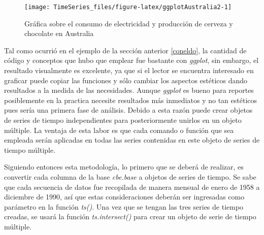 \documentclass[
  spanish,
]{book}
\newenvironment{Shaded}{\begin{snugshade}}{\end{snugshade}}
\newcommand{\AttributeTok}[1]{\textcolor[rgb]{0.77,0.63,0.00}{#1}}
\newcommand{\CommentTok}[1]{\textcolor[rgb]{0.56,0.35,0.01}{\textit{#1}}}
\newcommand{\DecValTok}[1]{\textcolor[rgb]{0.00,0.00,0.81}{#1}}
\newcommand{\FunctionTok}[1]{\textcolor[rgb]{0.00,0.00,0.00}{#1}}
\newcommand{\NormalTok}[1]{#1}
\newcommand{\OtherTok}[1]{\textcolor[rgb]{0.56,0.35,0.01}{#1}}
\newcommand{\SpecialCharTok}[1]{\textcolor[rgb]{0.00,0.00,0.00}{#1}}
\theoremstyle{remark}
\begin{document}
\begin{figure}

{\centering \texttt{[image: TimeSeries\_files/figure-latex/ggplotAustralia2-1]} 

}

\caption{Gráfica sobre el consumo de electricidad y producción de cerveza y chocolate en Australia}\label{fig:ggplotAustralia2}
\end{figure}

Tal como ocurrió en el ejemplo de la sección anterior \ref{coneldo}, la cantidad de código y conceptos que hubo que emplear fue bastante con \emph{ggplot}, sin embargo, el resultado visualmente es excelente, ya que si el lector se encuentra interesado en graficar puede copiar las funciones y sólo cambiar los aspectos estéticos dando resultados a la medida de las necesidades. Aunque \emph{ggplot} es bueno para reportes posiblemente en la practica necesite resultados más inmediatos y no tan estéticos pues sería una primera fase de análisis. Debido a esta razón puede crear objetos de series de tiempo independientes para posteriormente unirlos en un objeto múltiple. La ventaja de esta labor es que cada comando o función que sea empleada serán aplicadas en todas las series contenidas en este objeto de series de tiempo múltiple.

Siguiendo entonces esta metodología, lo primero que se deberá de realizar, es convertir cada columna de la base \emph{cbe.base} a objetos de series de tiempo. Se sabe que cada secuencia de datos fue recopilada de manera mensual de enero de 1958 a diciembre de 1990, así que estas consideraciones deberán ser ingresadas como parámetro en la función \emph{ts()}. Una vez que se tengan las tres series de tiempo creadas, se usará la función \emph{ts.intersect()} para crear un objeto de serie de tiempo múltiple.

\begin{Shaded}
\end{Shaded}
\end{document}
